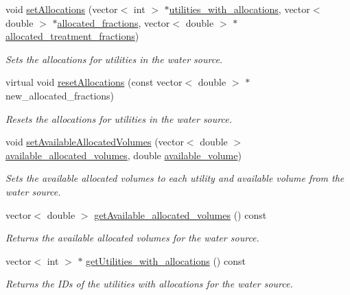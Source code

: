 \begin{DoxyCompactItemize}
void \mbox{\hyperlink{classWaterSource_ac834762e016e796968ad286feeca7be6}{set\+Allocations}} (vector$<$ int $>$ $\ast$\mbox{\hyperlink{classWaterSource_ac345583fc2d0f7e1db31ee40244d7ace}{utilities\+\_\+with\+\_\+allocations}}, vector$<$ double $>$ $\ast$\mbox{\hyperlink{classWaterSource_a2f6655a80c4847fe039987255d9d998c}{allocated\+\_\+fractions}}, vector$<$ double $>$ $\ast$\mbox{\hyperlink{classWaterSource_aa73fe10cfc6579b2fb79529e1dde5140}{allocated\+\_\+treatment\+\_\+fractions}})
\begin{DoxyCompactList}\small\item\em Sets the allocations for utilities in the water source. \end{DoxyCompactList}\item 
virtual void \mbox{\hyperlink{classWaterSource_afe2f6b96383abdb14563db279a261a31}{reset\+Allocations}} (const vector$<$ double $>$ $\ast$new\+\_\+allocated\+\_\+fractions)
\begin{DoxyCompactList}\small\item\em Resets the allocations for utilities in the water source. \end{DoxyCompactList}\item 
void \mbox{\hyperlink{classWaterSource_ae29ed4aa2b9c97c5a41772daf4631f05}{set\+Available\+Allocated\+Volumes}} (vector$<$ double $>$ \mbox{\hyperlink{classWaterSource_a77d3fe9ea445fc987b07debdfb9e2f5b}{available\+\_\+allocated\+\_\+volumes}}, double \mbox{\hyperlink{classWaterSource_a49e1a191152e344e2161e8db166e067a}{available\+\_\+volume}})
\begin{DoxyCompactList}\small\item\em Sets the available allocated volumes to each utility and available volume from the water source. \end{DoxyCompactList}\item 
vector$<$ double $>$ \mbox{\hyperlink{classWaterSource_a9a87dafd08834147bcf5004bc3907824}{get\+Available\+\_\+allocated\+\_\+volumes}} () const
\begin{DoxyCompactList}\small\item\em Returns the available allocated volumes for the water source. \end{DoxyCompactList}\item 
vector$<$ int $>$ $\ast$ \mbox{\hyperlink{classWaterSource_a41a9f1fb088f29633c9141687958c16e}{get\+Utilities\+\_\+with\+\_\+allocations}} () const
\begin{DoxyCompactList}\small\item\em Returns the I\+Ds of the utilities with allocations for the water source. \end{DoxyCompactList}\item 

\end{DoxyCompactItemize}
